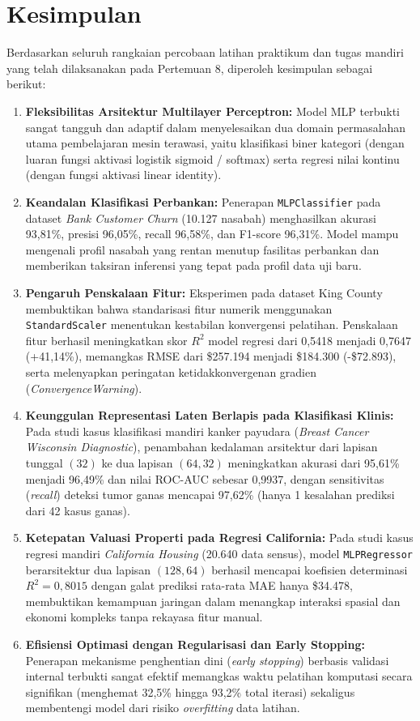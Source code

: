 \documentclass[a4paper,oneside,12pt]{report}
\begin{document}
\chapter{Kesimpulan}
Berdasarkan seluruh rangkaian percobaan latihan praktikum dan tugas mandiri yang telah dilaksanakan pada Pertemuan 8, diperoleh kesimpulan sebagai berikut:
\begin{enumerate}[noitemsep, topsep=2pt, parsep=1pt]
	\item \textbf{Fleksibilitas Arsitektur Multilayer Perceptron:} Model MLP terbukti sangat tangguh dan adaptif dalam menyelesaikan dua domain permasalahan utama pembelajaran mesin terawasi, yaitu klasifikasi biner kategori (dengan luaran fungsi aktivasi logistik sigmoid / softmax) serta regresi nilai kontinu (dengan fungsi aktivasi linear identity).
	\item \textbf{Keandalan Klasifikasi Perbankan:} Penerapan \texttt{MLPClassifier} pada dataset \textit{Bank Customer Churn} (10.127 nasabah) menghasilkan akurasi 93,81\%, presisi 96,05\%, recall 96,58\%, dan F1-score 96,31\%. Model mampu mengenali profil nasabah yang rentan menutup fasilitas perbankan dan memberikan taksiran inferensi yang tepat pada profil data uji baru.
	\item \textbf{Pengaruh Penskalaan Fitur:} Eksperimen pada dataset King County membuktikan bahwa standarisasi fitur numerik menggunakan \texttt{StandardScaler} menentukan kestabilan konvergensi pelatihan. Penskalaan fitur berhasil meningkatkan skor $R^2$ model regresi dari 0,5418 menjadi 0,7647 (+41,14\%), memangkas RMSE dari \$257.194 menjadi \$184.300 (-\$72.893), serta melenyapkan peringatan ketidakkonvergenan gradien (\textit{ConvergenceWarning}).
	\item \textbf{Keunggulan Representasi Laten Berlapis pada Klasifikasi Klinis:} Pada studi kasus klasifikasi mandiri kanker payudara (\textit{Breast Cancer Wisconsin Diagnostic}), penambahan kedalaman arsitektur dari lapisan tunggal $(32)$ ke dua lapisan $(64, 32)$ meningkatkan akurasi dari 95,61\% menjadi 96,49\% dan nilai ROC-AUC sebesar 0,9937, dengan sensitivitas (\textit{recall}) deteksi tumor ganas mencapai 97,62\% (hanya 1 kesalahan prediksi dari 42 kasus ganas).
	\item \textbf{Ketepatan Valuasi Properti pada Regresi California:} Pada studi kasus regresi mandiri \textit{California Housing} (20.640 data sensus), model \texttt{MLPRegressor} berarsitektur dua lapisan $(128, 64)$ berhasil mencapai koefisien determinasi $R^2 = 0,8015$ dengan galat prediksi rata-rata MAE hanya \$34.478, membuktikan kemampuan jaringan dalam menangkap interaksi spasial dan ekonomi kompleks tanpa rekayasa fitur manual.
	\item \textbf{Efisiensi Optimasi dengan Regularisasi dan Early Stopping:} Penerapan mekanisme penghentian dini (\textit{early stopping}) berbasis validasi internal terbukti sangat efektif memangkas waktu pelatihan komputasi secara signifikan (menghemat 32,5\% hingga 93,2\% total iterasi) sekaligus membentengi model dari risiko \textit{overfitting} data latihan.
\end{enumerate}
\end{document}
